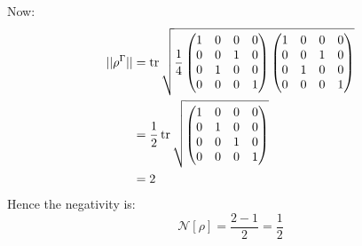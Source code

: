 \documentclass[12pt,a4]{article}
\begin{document}
\begin{enumerate}
\begin{enumerate}
        Now:
        \begin{align*}
          ||\rho^\Gamma || 
            &= \tr \sqrt{
              \frac{1}{4}
            \left(
              \begin{matrix}
                1 & 0 & 0 & 0\\
                0 & 0 & 1 & 0\\
                0 & 1 & 0 & 0\\
                0 & 0 & 0 & 1
              \end{matrix}
            \right)
            \left(
              \begin{matrix}
                1 & 0 & 0 & 0\\
                0 & 0 & 1 & 0\\
                0 & 1 & 0 & 0\\
                0 & 0 & 0 & 1
              \end{matrix}
            \right)
          }\\
          &= \frac{1}{2}\tr \sqrt{
            \left(
              \begin{matrix}
                1 & 0 & 0 & 0\\
                0 & 1 & 0 & 0\\
                0 & 0 & 1 & 0\\
                0 & 0 & 0 & 1
              \end{matrix}
            \right)
          }\\
          & = 2
        \end{align*}
        Hence the negativity is:
        \begin{equation*}
          \mathcal{N} [\rho] = \frac{2 - 1}{2} =\frac{1}{2} 
        \end{equation*}


\end{enumerate}
\end{enumerate}
\end{document}
